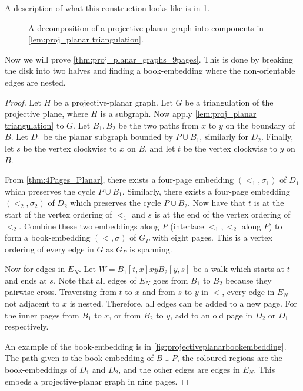 A description of what this construction looks like is in \cref{fig:projectiveplanardecomp}.
\begin{figure}[h]
    \centering
    
    \caption[Projective-Planar decomposition]{A decomposition of a projective-planar graph into components in \cref{lem:proj_planar triangulation}.}\label{fig:projectiveplanardecomp}
\end{figure}

Now we will prove \cref{thm:proj_planar_graphs_9pages}. This is done by breaking the disk into two halves and finding a book-embedding where the non-orientable edges are nested.
\begin{proof}
    Let $H$ be a projective-planar graph. Let $G$ be a triangulation of the projective plane, where $H$ is a subgraph.
    Now apply \cref{lem:proj_planar triangulation} to $G$. Let $B_1, B_2$ be the two paths from $x$ to $y$ on the boundary of $B$. Let $D_1$ be the planar subgraph bounded by $P \cup B_1$, similarly for $D_2$. Finally, let $s$ be the vertex clockwise to $x$ on $B$, and let $t$ be the vertex clockwise to $y$ on $B$.

    From \cref{thm:4Pages_Planar}, there exists a four-page embedding $(<_1, \sigma_1)$ of $D_1$ which preserves the cycle $P \cup B_1$. Similarly, there exists a four-page embedding $(<_2, \sigma_2)$ of $D_2$ which preserves the cycle $P \cup B_2$.
    Now have that $t$ is at the start of the vertex ordering of $<_1$ and $s$ is at the end of the vertex ordering of $<_2$. 
    Combine these two embeddings along $P$ (interlace $<_1, <_2$ along $P$) to form a book-embedding $(<, \sigma)$ of $G_P$ with eight pages. This is a vertex ordering of every edge in $G$ as $G_P$ is spanning. 

    Now for edges in $E_N$. Let $W = B_1[t, x] xy B_2[y, s]$ be a walk which starts at $t$ and ends at $s$. Note that all edges of $E_N$ goes from $B_1$ to $B_2$ because they pairwise cross. Traversing from $t$ to $x$ and from $s$ to $y$ in $<$, every edge in $E_N$ not adjacent to $x$ is nested. Therefore, all edges can be added to a new page. For the inner pages from $B_1$ to $x$, or from $B_2$ to $y$, add to an old page in $D_2$ or $D_1$ respectively. 

    An example of the book-embedding is in \cref{fig:projectiveplanarbookembedding}. The path given is the book-embedding of $B \cup P$, the coloured regions are the book-embeddings of $D_1$ and $D_2$, and the other edges are edges in $E_N$. 
    This embeds a projective-planar graph in nine pages.
\end{proof}



